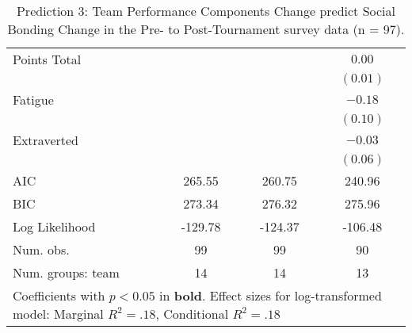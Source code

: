 \begin{table}
\begin{center}
\begin{tabular}{l c c c }
Points Total                                             &                       &                       & $0.00$                \\
                                                         &                       &                       & $(0.01)$              \\
Fatigue                                                  &                       &                       & $-0.18$               \\
                                                         &                       &                       & $(0.10)$              \\
Extraverted                                              &                       &                       & $-0.03$               \\
                                                         &                       &                       & $(0.06)$              \\
\midrule
AIC                                                      & 265.55                & 260.75                & 240.96                \\
BIC                                                      & 273.34                & 276.32                & 275.96                \\
Log Likelihood                                           & -129.78               & -124.37               & -106.48               \\
Num. obs.                                                & 99                    & 99                    & 90                    \\
Num. groups: team                                        & 14                    & 14                    & 13        \\           
\bottomrule
\multicolumn{4}{l}{\scriptsize{Coefficients with $p < 0.05$ in \textbf{bold}. Effect sizes for log-transformed model: Marginal $R^2 = .18$, Conditional $R^2 = .18$}}
\end{tabular}
\caption{Prediction 3: Team Performance Components Change predict Social Bonding Change in the Pre- to Post-Tournament survey data (n = 97).}
\label{tab:MLM23aJointActionSuccessBonding}
\end{center}
\end{table}
